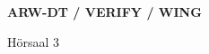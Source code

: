 \documentclass[a4paper]{article}
\begin{document}
\printGenericVSLHeader
\begin{center}
\begin{vsltext}{2.5cm}{4cm}

   \vspace{0.5cm} 

    \textbf{ARW-DT / VERIFY / WING} 

\end{vsltext}
\begin{vsltext}{3cm}{4cm}

    \vspace{1.5cm}

    Hörsaal 3

\end{vsltext}

\end{center}
\end{document}
